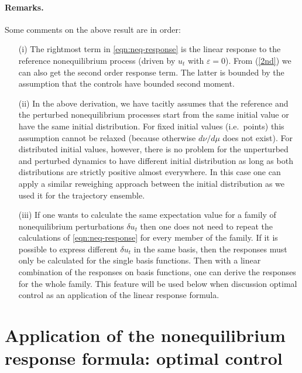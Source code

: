 \documentclass[]{tMPH2e}
\newcommand{\eps}{\varepsilon}
\begin{document}
\paragraph*{Remarks.} Some comments on the above result are in order:
\begin{itemize}

\item[(i)] The rightmost term in \eqref{eqn:neq-response} is the linear 
  response to the reference nonequilibrium process (driven by $u_t$ with $\eps=0$).  From (\ref{2nd}) we can also get the second order response term. The latter is bounded by the assumption that the controls have bounded second moment.  

\item[(ii)] In the above derivation, we have tacitly assumes that the reference and the perturbed nonequilibrium processes start from the same initial value or
  have the same initial distribution. For fixed initial values (i.e.~points) this assumption cannot be relaxed (because otherwise $d\nu/d\mu$ does not exist). For distributed initial values, however, there is no problem for the unperturbed and perturbed dynamics to have different initial distribution as long as both distributions are strictly positive almost everywhere. In this case one can apply a similar reweighing approach between the initial distribution as we used it for the trajectory ensemble.  

\item[(iii)] If one wants to calculate the same expectation value for a family of nonequilibrium perturbations $\delta u_t$ then 
one does not need to repeat the calculations of \eqref{eqn:neq-response} for every member of the family. 
  If it is possible to
  express different $\delta u_t$ in the same basis, then the responses must only be
  calculated for the single basis functions. Then with a linear combination of the responses on basis functions, one can derive
  the responses for the whole family. This feature will be used below when discussion optimal control as an application of the linear response formula. 
  

\end{itemize}





\section{Application of the nonequilibrium response formula: optimal control}
\end{document}
